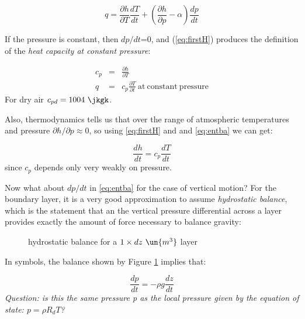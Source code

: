 \documentclass[12pt]{article}
\begin{document}
\begin{equation}
  \label{eq:firstH}
  q = \frac{\partial h}{\partial T} \frac{dT}{dt} + \left ( \frac{\partial h}{\partial p} - \alpha 
                        \right ) \frac{dp}{dt}
\end{equation}


If the pressure is constant, then $dp/dt$=0, and (\ref{eq:firstH})
produces the definition of the \textit{heat capacity at constant
  pressure}:

\begin{eqnarray}
  \label{eq:hcp}
  c_p &=& \frac{\partial{h}}{\partial T}\\
  q &=& c_p \frac{\partial T}{\partial t}\ \mathrm{at\ constant\ pressure}
\end{eqnarray}
For dry air $c_{pd} = 1004\ \jkgk$.

Also, thermodynamics tells us that over the range of atmospheric
temperatures and pressure $\partial h/\partial p \approx 0$, so using
\eqref{eq:firstH} and and \eqref{eq:entba} we can get:

\begin{equation}
  \label{eq:enthal}
  \frac{dh}{dt} = c_p \frac{dT}{dt}
\end{equation}
since $c_p$ depends only very weakly on pressure.

Now what about $dp/dt$ in \eqref{eq:entba} for the case of vertical
motion?  For the boundary layer, it is a very good approximation to
assume \textit{hydrostatic balance}, which is the statement that an
the vertical pressure differential across a layer provides exactly the
amount of force necessary to balance gravity:

  \begin{figure}[H]
    \begin{center}
       
      \caption{hydrostatic balance for a $1 \times dz\  \un{m^3}$ layer}
      \label{fig:hydro}
    \end{center}
  \end{figure}

\vspace{0.1in}

In symbols, the balance shown by Figure \ref{fig:hydro} implies that:

\begin{equation}
  \label{eq:hydro}
  \frac{dp}{dt} = - \rho g \frac{dz}{dt}
\end{equation}
\textit{Question:  is this the same pressure p as the local pressure given by the equation of state: $p=\rho R_d T$?}
\end{document}
